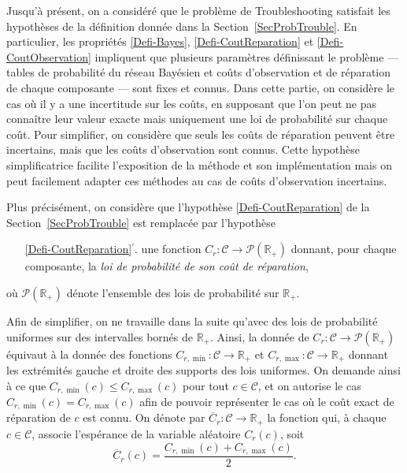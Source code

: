 \documentclass[a4paper,11pt]{article}
\theoremstyle{plain}
\theoremstyle{definition}
\begin{document}
Jusqu'à présent, on a considéré que le problème de Troubleshooting satisfait les hypothèses de la définition donnée dans la Section~\ref{SecProbTrouble}. En particulier, les propriétés \ref{Defi-Bayes}, \ref{Defi-CoutReparation} et \ref{Defi-CoutObservation} impliquent que plusieurs paramètres définissant le problème --- tables de probabilité du réseau Bayésien et coûts d'observation et de réparation de chaque composante --- sont fixes et connus. Dans cette partie, on considère le cas où il y a une incertitude sur les coûts, en supposant que l'on peut ne pas connaître leur valeur exacte mais uniquement une loi de probabilité sur chaque coût. Pour simplifier, on considère que seuls les coûts de réparation peuvent être incertains, mais que les coûts d'observation sont connus. Cette hypothèse simplificatrice facilite l'exposition de la méthode et son implémentation mais on peut facilement adapter ces méthodes au cas de coûts d'observation incertains.

Plus précisément, on considère que l'hypothèse \ref{Defi-CoutReparation} de la Section~\ref{SecProbTrouble} est remplacée par l'hypothèse
\begin{enumerate}
\item[\ref{Defi-CoutReparation}$^\prime$.] une fonction $C_r: \mathcal C \to \mathcal P(\mathbb R_+)$ donnant, pour chaque composante, la \emph{loi de probabilité de son coût de réparation},
\end{enumerate}
où $\mathcal P(\mathbb R_+)$ dénote l'ensemble des lois de probabilité sur $\mathbb R_+$.

Afin de simplifier, on ne travaille dans la suite qu'avec des lois de probabilité uniformes sur des intervalles bornés de $\mathbb R_+$. Ainsi, la donnée de $C_r: \mathcal C \to \mathcal P(\mathbb R_+)$ équivaut à la donnée des fonctions $C_{r, \min}: \mathcal C \to \mathbb R_+$ et $C_{r, \max}: \mathcal C \to \mathbb R_+$ donnant les extrémités gauche et droite des supports des lois uniformes. On demande ainsi à ce que $C_{r, \min}(c) \leq C_{r, \max}(c)$ pour tout $c \in \mathcal C$, et on autorise le cas $C_{r, \min}(c) = C_{r, \max}(c)$ afin de pouvoir représenter le cas où le coût exact de réparation de $c$ est connu. On dénote par $\overline C_r: \mathcal C \to \mathbb R_+$ la fonction qui, à chaque $c \in \mathcal C$, associe l'espérance de la variable aléatoire $C_r(c)$, soit
\[\overline C_r(c) = \frac{C_{r, \min}(c) + C_{r, \max}(c)}{2}.\]
\end{document}
